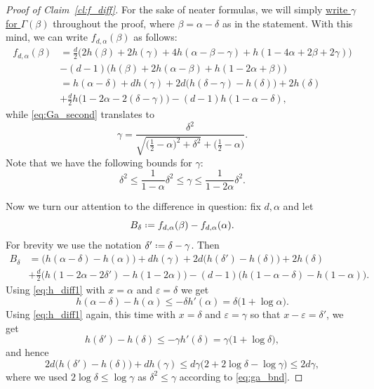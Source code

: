\documentclass[10pt,a4paper]{amsart}
\newcommand\Ga{\Gamma}
\newcommand\al{\alpha}
\newcommand\be{\beta}
\newcommand\de{\delta}
\newcommand{\defeq}{\mathrel{\vcenter{\baselineskip0.5ex \lineskiplimit0pt
                     \hbox{\scriptsize.}\hbox{\scriptsize.}}}%
                     =}
\newcommand\eps{\varepsilon}
\newcommand\ga{\gamma}
\begin{document}
\begin{proof}[Proof of Claim~\ref{cl:f_diff}]
For the sake of neater formulas, we will simply \underline{write $\ga$ for $\Ga(\be)$} throughout the proof, where $\be=\al-\de$ as in the statement. With this mind, we can write $f_{d,\al}(\be)$ as follows:
%
\begin{align*}
f_{d,\al}(\be) 
&= \frac{d}{2} \bigg( 2h(\be)+2h(\ga)
+4 h(\al-\be-\ga) + h(1-4\al+2\be+2\ga) \bigg) \\
&- (d-1) \bigg( h(\be)+ 2h(\al-\be) 
+ h(1-2\al+\be) \bigg) \\
&= h(\al-\de) + d h(\ga) 
+ 2d \bigg( h(\de-\ga) - h(\de) \bigg) + 2h(\de) \\
&+ \frac{d}{2} h\big(1-2\al-2(\de-\ga)\big) 
- (d-1) h(1-\al-\de) ,
\end{align*}  
%
while \eqref{eq:Ga_second} translates to 
%
\begin{equation} \label{eq:ga_bounds}
\ga= \frac{\de^2}{\sqrt{\big(\frac12-\al\big)^2+\de^2}+\big(\frac12-\al\big)} .
\end{equation}
%
Note that we have the following bounds for $\ga$:
%
\begin{equation} \label{eq:ga_bnd}
\de^2 
\leq \frac{1}{1-\al} \de^2
\leq \ga 
\leq \frac{1}{1-2\al} \de^2 .
\end{equation}
%

Now we turn our attention to the difference in question: fix $d,\al$ and let 
%
\begin{equation} \label{eq:B_de}
B_\de \defeq f_{d,\al}(\be)-f_{d,\al}(\al) . 
\end{equation}
%
For brevity we use the notation $\de' \defeq \de-\ga$. Then 
%
\begin{align*}
B_\de 
&= \bigg( h(\al-\de) - h(\al) \bigg) + d h(\ga) 
+ 2d \bigg( h(\de') - h(\de) \bigg) + 2h(\de) \\
&+ \frac{d}{2} \bigg( h(1-2\al-2\de') - h(1-2\al) \bigg)
- (d-1) \bigg( h(1-\al-\de) - h(1-\al) \bigg).
\end{align*}  
%
Using \eqref{eq:h_diff1} with $x=\al$ and $\eps=\de$ we get 
%
\begin{equation} \label{eq:bnd1}
h(\al-\de) - h(\al) \leq -\de h'(\al) 
= \de \big( 1+\log \al \big) .
\end{equation}
%
Using \eqref{eq:h_diff1} again, this time with $x=\de$ and $\eps=\ga$ so that $x-\eps=\de'$, we get 
%
\[ h(\de') - h(\de) \leq -\ga h'(\de) 
= \ga \big( 1+ \log \de \big) ,\]
%
and hence 
%
\begin{equation} \label{eq:bnd2}
2d\bigg( h(\de') - h(\de) \bigg) + d h(\ga) 
\leq d \ga \big(2 + 2 \log \de  - \log \ga \big) 
\leq 2d \ga ,
\end{equation}
%
where we used $2 \log \de \leq \log \ga$ as $\de^2 \leq \ga$ according to \eqref{eq:ga_bnd}. 



\end{proof}
\end{document}
